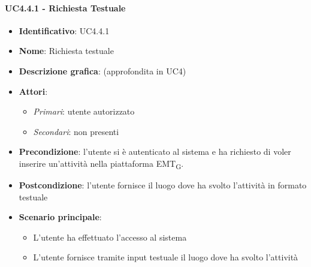 \paragraph{UC4.4.1 - Richiesta Testuale}
\begin{itemize}
   \item \textbf{Identificativo}: UC4.4.1
   \item \textbf{Nome}: Richiesta testuale
   \item \textbf{Descrizione grafica}: (approfondita in UC4)
   \item \textbf{Attori}:
   \begin{itemize} 
       \item \textit{Primari}: utente autorizzato
       \item \textit{Secondari}: non presenti
   \end{itemize}
       \item \textbf{Precondizione}: l'utente si è autenticato al sistema e ha richiesto di voler inserire un'attività nella piattaforma EMT\textsubscript{G}. 
       \item \textbf{Postcondizione}: l'utente fornisce il luogo dove ha svolto l'attività in formato testuale
    \item \textbf{Scenario principale}: 
       \begin{itemize}
           \item L'utente ha effettuato l'accesso al sistema 
           \item L'utente fornisce tramite input testuale il luogo dove ha svolto l'attività
       \end{itemize}
\end{itemize}

